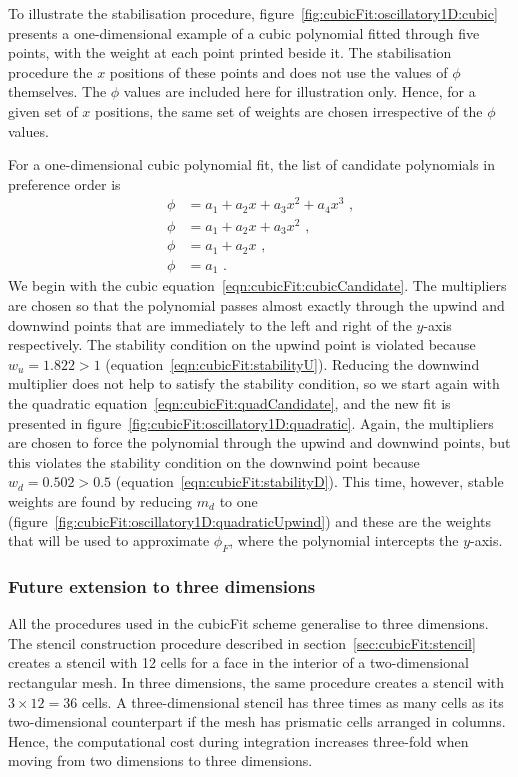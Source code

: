 To illustrate the stabilisation procedure, figure~\ref{fig:cubicFit:oscillatory1D:cubic} presents a one-dimensional example of a cubic polynomial fitted through five points, with the weight at each point printed beside it.
The stabilisation procedure  the $x$ positions of these points and does not use the values of $\phi$ themselves.  The $\phi$ values are included here for illustration only.
Hence, for a given set of $x$ positions, the same set of weights are chosen irrespective of the $\phi$ values.

For a one-dimensional cubic polynomial fit, the list of candidate polynomials in preference order is
\begin{align}
	\phi &= a_1 + a_2 x + a_3 x^2 + a_4 x^3 \label{eqn:cubicFit:cubicCandidate} \text{ ,} \\
	\phi &= a_1 + a_2 x + a_3 x^2 \label{eqn:cubicFit:quadCandidate} \text{ ,} \\
	\phi &= a_1 + a_2 x \text{ ,} \\
	\phi &= a_1 \text{ .}
\end{align}
We begin with the cubic equation~\eqref{eqn:cubicFit:cubicCandidate}.  The multipliers are chosen so that the polynomial passes almost exactly through the upwind and downwind points that are immediately to the left and right of the $y$-axis respectively.
The stability condition on the upwind point is violated because $w_u = 1.822 > 1$ (equation~\ref{eqn:cubicFit:stabilityU}).  Reducing the downwind multiplier does not help to satisfy the stability condition, so we start again with the quadratic equation~\eqref{eqn:cubicFit:quadCandidate}, and the new fit is presented in figure~\ref{fig:cubicFit:oscillatory1D:quadratic}.
Again, the multipliers are chosen to force the polynomial through the upwind and downwind points, but this violates the stability condition on the downwind point because $w_d = 0.502 > 0.5$ (equation~\ref{eqn:cubicFit:stabilityD}).  This time, however, stable weights are found by reducing $m_d$ to one (figure~\ref{fig:cubicFit:oscillatory1D:quadraticUpwind}) and these are the weights that will be used to approximate $\phi_F$, where the polynomial intercepts the $y$-axis.

\subsubsection{Future extension to three dimensions}
All the procedures used in the cubicFit scheme generalise to three dimensions.  The stencil construction procedure described in section~\ref{sec:cubicFit:stencil} creates a stencil with \num{12} cells for a face in the interior of a two-dimensional rectangular mesh.  In three dimensions, the same procedure creates a stencil with $3 \times 12 = 36$ cells.
A three-dimensional stencil has three times as many cells as its two-dimensional counterpart if the mesh has prismatic cells arranged in columns.  Hence, the computational cost during integration increases three-fold when moving from two dimensions to three dimensions.

